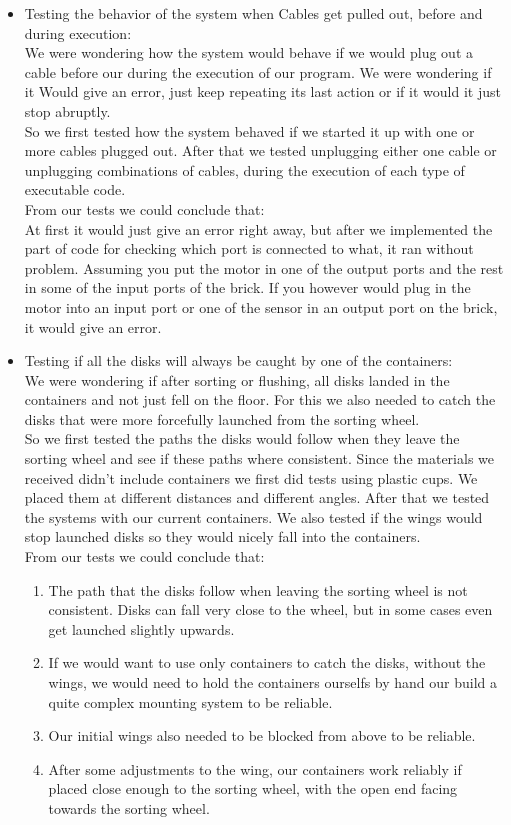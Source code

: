 \begin{itemize}
\item Testing the behavior of the system when Cables get pulled out, before and during execution:\\
We were wondering how the system would behave if we would plug out a cable before our during the execution of our program. We were wondering if it Would give an error, just keep repeating its last action or if it would it just stop abruptly.\\
So we first tested how the system behaved if we started it up with one or more cables plugged out.
After that we tested unplugging either one cable or unplugging combinations of cables, during the execution of each type of executable code.\\
From our tests we could conclude that:\\
At first it would just give an error right away, but after we implemented the part of code for checking which port is connected to what, it ran without problem. Assuming you put the motor in one of the output ports and the rest in some of the input ports of the brick. If you however would plug in the motor into an input port or one of the sensor in an output port on the brick, it would give an error.\\


\item Testing if all the disks will always be caught by one of the containers:\\
We were wondering if after sorting or flushing, all disks landed in the containers and not just fell on the floor. For this we also needed to catch the disks that were more forcefully launched from the sorting wheel.\\
So we first tested the paths the disks would follow when they leave the sorting wheel and see if these paths where consistent.
Since the materials we received didn't include containers we first did tests using plastic cups. We placed them at different distances and different angles.
After that we tested the systems with our current containers. We also tested if the wings would stop launched disks so they would nicely fall into the containers.\\
From our tests we could conclude that:
\begin{enumerate}
  \item{The path that the disks follow when leaving the sorting wheel is not consistent. Disks can fall very close to the wheel, but in some cases even get launched slightly upwards.}
  \item{If we would want to use only containers to catch the disks, without the wings, we would need to hold the containers ourselfs by hand our build a quite complex mounting system to be reliable.}
  \item{Our initial wings also needed to be blocked from above to be reliable.}
  \item{After some adjustments to the wing, our containers work reliably if placed close enough to the sorting wheel, with the open end facing towards the sorting wheel.}
\end{enumerate}



\end{itemize}
